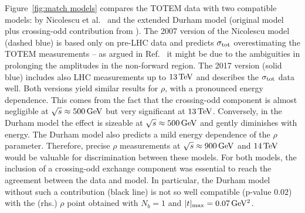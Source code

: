 Figure~\ref{fig:match models} compares the TOTEM data with two compatible models: by Nicolescu et al.~\cite{nicolescu-2017} and the extended Durham model \cite{durham-2018} (original model \cite{durham-2014} plus crossing-odd contribution from \cite{levin-1990}). The 2007 version of the Nicolescu model (dashed blue) is based only on pre-LHC data and predicts $\sigma_{\rm tot}$ overestimating the TOTEM measurements -- as argued in Ref.~\cite{nicolescu-2017} it might be due to the ambiguities in prolonging the amplitudes in the non-forward region. The 2017 version (solid blue) includes also LHC measurements up to $13\,{\rm TeV}$ and describes the $\sigma_{\rm tot}$ data well. Both versions yield similar results for $\rho$, with a pronounced energy dependence. This comes from the fact that the crossing-odd component is almost negligible at $\sqrt s \approx 500\,{\rm GeV}$ but very significant at $13\,{\rm TeV}$. Conversely, in the Durham model the effect is sizeable at $\sqrt s \approx 500\,{\rm GeV}$ and gently diminishes with energy. The Durham model also predicts a mild energy dependence of the $\rho$ parameter. Therefore, precise $\rho$ measurements at $\sqrt s \approx 900\,{\rm GeV}$ and $14\,{\rm TeV}$ would be valuable for discrimination between these models. For both models, the inclusion of a crossing-odd exchange component was essential to reach the agreement between the data and model. In particular, the Durham model without such a contribution (black line) is not so well compatible (p-value $0.02$) with the (rhs.) $\rho$ point obtained with $N_b=1$ and $|t|_{\rm max} = 0.07\,{\rm GeV^2}$.
